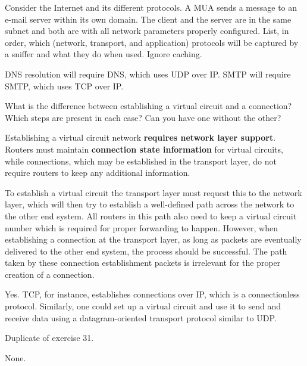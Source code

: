 \begin{Exercise}
Consider the Internet and its different protocols. A MUA sends a message to an e-mail server within its own domain. The client and the server are in the same subnet and both are with all network parameters properly configured. List, in order, which (network, transport, and application) protocols will be captured by a sniffer and what they do when used. Ignore caching.
\end{Exercise}
\begin{Answer}
DNS resolution will require DNS, which uses UDP over IP.
SMTP will require SMTP, which uses TCP over IP.
\end{Answer}

\begin{Exercise}
What is the difference between establishing a virtual circuit and a connection?
Which steps are present in each case?
Can you have one without the other?
\end{Exercise}
\begin{Answer}
Establishing a virtual circuit network \textbf{requires network layer support}.
Routers must maintain \textbf{connection state information} for virtual circuits, while connections, which may be established in the transport layer, do not require routers to keep any additional information.

To establish a virtual circuit the transport layer must request this to the network layer, which will then try to establish a well-defined path across the network to the other end system.
All routers in this path also need to keep a virtual circuit number which is required for proper forwarding to happen.
However, when establishing a connection at the transport layer, as long as packets are eventually delivered to the other end system, the process should be successful.
The path taken by these connection establishment packets is irrelevant for the proper creation of a connection.

Yes. TCP, for instance, establishes connections over IP, which is a connectionless protocol.
Similarly, one could set up a virtual circuit and use it to send and receive data using a datagram-oriented transport protocol similar to UDP.
\end{Answer}

\begin{Exercise}
Duplicate of exercise 31.
\end{Exercise}
\begin{Answer}
None.
\end{Answer}

